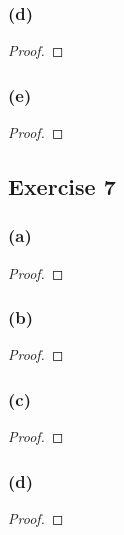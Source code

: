 \documentclass[14pt]{extarticle}
\begin{document}
\subsubsection{(d)}

\begin{proof}

\end{proof}

\subsubsection{(e)}

\begin{proof}

\end{proof}

\subsection{Exercise 7}

\subsubsection{(a)}

\begin{proof}

\end{proof}

\subsubsection{(b)}

\begin{proof}

\end{proof}

\subsubsection{(c)}

\begin{proof}

\end{proof}

\subsubsection{(d)}

\begin{proof}

\end{proof}
\end{document}
